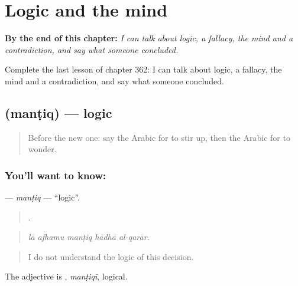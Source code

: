 
\chapter{Logic and the mind}
\label{ch:ar-logic-and-the-mind}

\begin{chapteropening}
\textbf{By the end of this chapter:} \emph{I can talk about logic, a fallacy, the mind and a contradiction, and say what someone concluded.}

Complete the last lesson of chapter 362: I can talk about logic, a fallacy, the mind and a contradiction, and say what someone concluded.
\end{chapteropening}

\section[\texorpdfstring{\ar{منطق} (manṭiq)}{منطق (manṭiq)}]{ (manṭiq) — logic}

\label{lesson:AR-C362-mantiq}



\begin{quote}
Before the new one: say the Arabic for to stir up, then the Arabic for to wonder.
\end{quote}

\subsection*{You'll want to know: }
\textbf{} — \emph{manṭiq} — \textquotedblleft{}logic\textquotedblright{}.

\begin{quote}
    .
\end{quote}

\begin{quote}
\emph{lā afhamu manṭiq hādhā al-qarār.}
\end{quote}

\begin{quote}
I do not understand the logic of this decision.
\end{quote}

The adjective is , \emph{manṭiqī}, logical.


